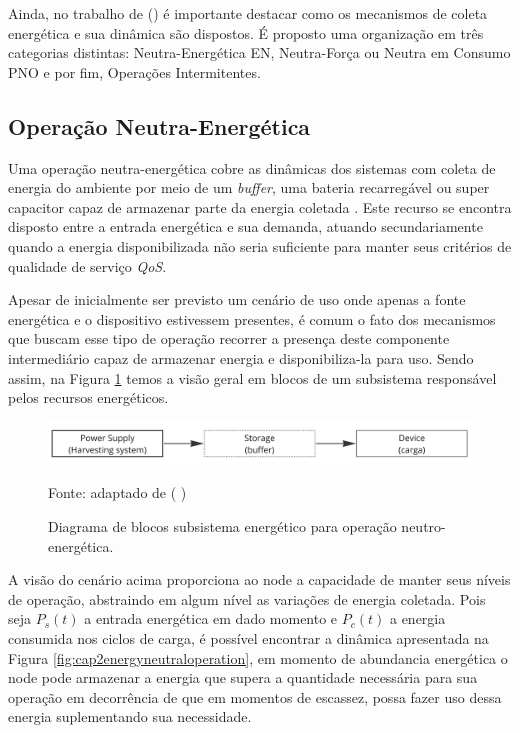 Ainda, no trabalho de \citeauthor{sliper_energy-driven_2020} (\citeyear{sliper_energy-driven_2020}) é importante destacar como os mecanismos de coleta energética e sua dinâmica são dispostos. É proposto uma organização em três categorias distintas: Neutra-Energética \ac{EN}, Neutra-Força ou Neutra em Consumo \ac{PNO} e por fim, Operações Intermitentes.

\subsection{Operação Neutra-Energética}
Uma operação neutra-energética cobre as dinâmicas dos sistemas com coleta de energia do ambiente por meio de um \textit{buffer}, uma bateria recarregável ou super capacitor capaz de armazenar parte da energia coletada \cite{kansal_power_2007}. Este recurso se encontra disposto entre a entrada energética e sua demanda, atuando secundariamente quando a energia disponibilizada não seria suficiente para manter seus critérios de qualidade de serviço \textit{QoS}.

Apesar de inicialmente ser previsto um cenário de uso onde apenas a fonte energética e o dispositivo estivessem presentes, é comum o fato dos mecanismos que buscam esse tipo de operação recorrer a presença deste componente intermediário capaz de armazenar energia e disponibiliza-la para uso. Sendo assim, na Figura \ref{fig:cap2harveststoreuse} temos a visão geral em blocos de um subsistema responsável pelos recursos energéticos.

\begin{figure}[H]
	\centering
	\caption{Diagrama de blocos subsistema energético para operação neutro-energética.}
	\label{fig:cap2harveststoreuse}
	\includegraphics[width=0.7\linewidth]{Imagens/cap2/cap2harvest_store_use}	
	
	Fonte: adaptado de \citeauthor{sudevalayam_energy_2011} (\citeyear{sudevalayam_energy_2011} )
\end{figure}

A visão do cenário acima proporciona ao node a capacidade de manter seus níveis de operação, abstraindo em algum nível as variações de energia coletada. Pois seja $P_{s}(t)$ a entrada energética em dado momento e  $P_{c}(t)$ a energia consumida nos ciclos de carga, é possível encontrar a dinâmica apresentada na Figura \ref{fig:cap2energyneutraloperation}, em momento de abundancia energética o node pode armazenar a energia que supera a quantidade necessária para sua operação em decorrência de que em momentos de escassez, possa fazer uso dessa energia suplementando sua necessidade. 


